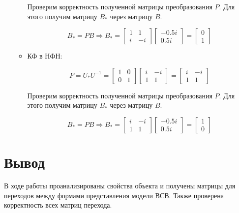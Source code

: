 \begin{itemize}
\begin{itemize}
	Проверим корректность полученной матрицы преобразования $P$. Для этого получим матрицу $B_{*}$ через матрицу $B$.
	
	\begin{equation*}
	\text{$B_{*}=PB$}
	\Longrightarrow
	\text{$B_{*}=
	\begin{bmatrix}1  &  1 \\
   i  & -i\end{bmatrix}
   \begin{bmatrix} -0.5i \\ 0.5i \end{bmatrix}
   =\begin{bmatrix} 0 \\ 1 \end{bmatrix}$}
	\end{equation*}
	

	
	\item КФ в НФН:
	
	\begin{equation*}
	\text{$P=U_{*}U^{-1}=
	\begin{bmatrix} 1 &         0 \\
         0  &  1 \end{bmatrix}
         	\begin{bmatrix}i &   -i \\
    1  &  1 \end{bmatrix}
=\begin{bmatrix}i &  -i \\
    1  &  1\end{bmatrix}$}
	\end{equation*}
	
	Проверим корректность полученной матрицы преобразования $P$. Для этого получим матрицу $B_{*}$ через матрицу $B$.
	
	\begin{equation*}
	\text{$B_{*}=PB$}
	\Longrightarrow
	\text{$B_{*}=
\begin{bmatrix}i &  -i \\
    1  &  1\end{bmatrix}
         \begin{bmatrix} -0.5i \\ 0.5i \end{bmatrix}
         =\begin{bmatrix} 1 \\ 0 \end{bmatrix}$}
	\end{equation*}
		
	\end{itemize}
\end{itemize}


\section{Вывод}

В ходе работы проанализированы свойства объекта и получены матрицы для переходов между
формами представления модели ВСВ. Также проверена корректность всех матриц перехода.
 
